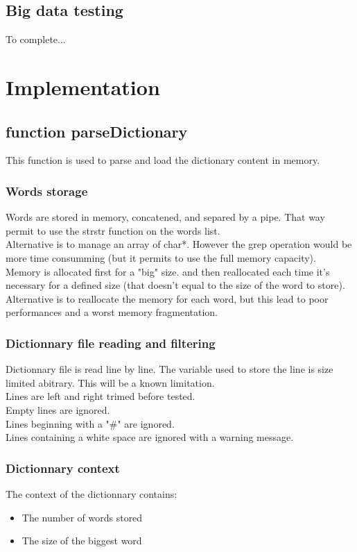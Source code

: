 \documentclass[11pt]{article} %
\begin{document}
\subsection{Big data testing}
To complete...

\section{Implementation}
\subsection{function parseDictionary}
This function is used to parse and load the dictionary content in memory.
\subsubsection{Words storage}
Words are stored in memory, concatened, and separed by a pipe. That way permit to use the strstr function on the words list.\\
Alternative is to manage an array of char*. However the grep operation would be more time consumming (but it permits to use the full memory capacity).\\
Memory is allocated first for a "big" size. and then reallocated each time it's necessary for a defined size (that doesn't equal to the size of the word to store).\\
Alternative is to reallocate the memory for each word, but this lead to poor performances and a worst memory fragmentation.
\subsubsection{Dictionnary file reading and filtering}
Dictionnary file is read line by line. The variable used to store the line is size limited abitrary. This will be a known limitation.\\
Lines are left and right trimed before tested.\\
Empty lines are ignored.\\
Lines beginning with a "\#" are ignored.\\
Lines containing a white space are ignored with a warning message.
\subsubsection{Dictionnary context}
The context of the dictionnary contains:
\begin{itemize}
\item The number of words stored
\item The size of the biggest word
\end{itemize}
\end{document}
